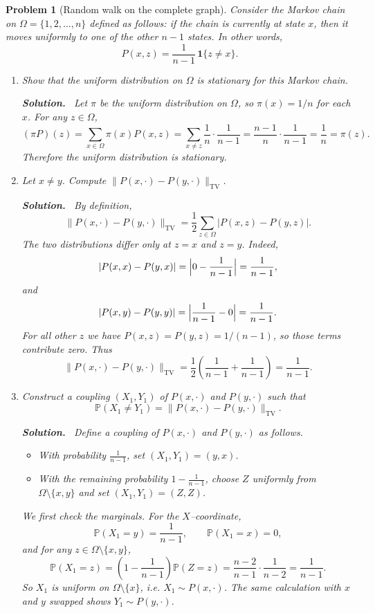 \documentclass[11pt]{article}
\newtheorem{problem}{Problem}
\newenvironment{solution}{\par\noindent\textbf{Solution.}\ }{\par}
\begin{document}
\begin{problem}[Random walk on the complete graph]
Consider the Markov chain on $\Omega = \{1,2,\dots,n\}$ defined as follows: if the
chain is currently at state $x$, then it moves uniformly to one of the other $n-1$
states. In other words,
\[
  P(x,z) = \frac{1}{n-1}\,\mathbf{1}\{z \neq x\}.
\]

\begin{enumerate}
\item Show that the uniform distribution on $\Omega$ is stationary for this Markov
chain.

\begin{solution}
Let $\pi$ be the uniform distribution on $\Omega$, so $\pi(x) = 1/n$ for each
$x$. For any $z \in \Omega$,
\[
  (\pi P)(z)
  = \sum_{x \in \Omega} \pi(x)P(x,z)
  = \sum_{x \neq z} \frac{1}{n}\cdot \frac{1}{n-1}
  = \frac{n-1}{n}\cdot \frac{1}{n-1}
  = \frac{1}{n}
  = \pi(z).
\]
Therefore the uniform distribution is stationary.\qedhere
\end{solution}

\item Let $x \neq y$. Compute $\|P(x,\cdot) - P(y,\cdot)\|_{\mathrm{TV}}$.

\begin{solution}
By definition,
\[
  \|P(x,\cdot) - P(y,\cdot)\|_{\mathrm{TV}}
  = \frac{1}{2} \sum_{z \in \Omega} \bigl|P(x,z) - P(y,z)\bigr|.
\]
The two distributions differ only at $z=x$ and $z=y$. Indeed,
\[
  |P(x,x) - P(y,x)|
  = \Bigl|0 - \frac{1}{n-1}\Bigr|
  = \frac{1}{n-1},
\]
and
\[
  |P(x,y) - P(y,y)|
  = \Bigl|\frac{1}{n-1} - 0\Bigr|
  = \frac{1}{n-1}.
\]
For all other $z$ we have $P(x,z) = P(y,z) = 1/(n-1)$, so those terms contribute
zero. Thus
\[
  \|P(x,\cdot) - P(y,\cdot)\|_{\mathrm{TV}}
  = \frac{1}{2}\left(\frac{1}{n-1} + \frac{1}{n-1}\right)
  = \frac{1}{n-1}.
\]
\qedhere
\end{solution}

\item Construct a coupling $(X_1,Y_1)$ of $P(x,\cdot)$ and $P(y,\cdot)$ such that
\[\mathbb{P}(X_1 \neq Y_1) = \|P(x,\cdot) - P(y,\cdot)\|_{\mathrm{TV}}.\]

\begin{solution}
Define a coupling of $P(x,\cdot)$ and $P(y,\cdot)$ as follows.
\begin{itemize}
  \item With probability $\tfrac{1}{n-1}$, set $(X_1,Y_1) = (y,x)$.
  \item With the remaining probability $1 - \tfrac{1}{n-1}$, choose $Z$ uniformly
        from $\Omega \setminus \{x,y\}$ and set $(X_1,Y_1) = (Z,Z)$.
\end{itemize}
We first check the marginals. For the $X$–coordinate,
\[
  \mathbb{P}(X_1 = y) = \frac{1}{n-1}, \qquad
  \mathbb{P}(X_1 = x) = 0,
\]
and for any $z \in \Omega \setminus \{x,y\}$,
\[
  \mathbb{P}(X_1 = z)
  = \left(1 - \frac{1}{n-1}\right) \mathbb{P}(Z = z)
  = \frac{n-2}{n-1} \cdot \frac{1}{n-2}
  = \frac{1}{n-1}.
\]
So $X_1$ is uniform on $\Omega \setminus \{x\}$, i.e. $X_1 \sim P(x,\cdot)$. The
same calculation with $x$ and $y$ swapped shows $Y_1 \sim P(y,\cdot)$.


\end{solution}
\end{enumerate}
\end{problem}
\end{document}
